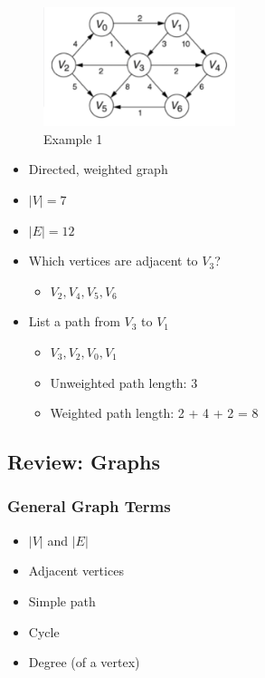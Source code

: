 \documentclass[
  10pt,
  english,
  letterpaper,
,tablecaptionabove
]{scrartcl}
\providecommand{\tightlist}{%
  \setlength{\itemsep}{0pt}\setlength{\parskip}{0pt}}
\begin{document}
\begin{figure}
\centering
\includegraphics[width=0.5\textwidth,height=\textheight]{images/2.png}
\caption{Example 1}
\end{figure}

\begin{itemize}
\tightlist
\item
  Directed, weighted graph
\item
  \(|V| = 7\)
\item
  \(|E| = 12\)
\item
  Which vertices are adjacent to \(V_3\)?

  \begin{itemize}
  \tightlist
  \item
    \(V_2, V_4, V_5, V_6\)
  \end{itemize}
\item
  List a path from \(V_3\) to \(V_1\)

  \begin{itemize}
  \tightlist
  \item
    \(V_3, V_2, V_0, V_1\)
  \item
    Unweighted path length: 3
  \item
    Weighted path length: 2 + 4 + 2 = 8
  \end{itemize}
\end{itemize}

\hypertarget{review-graphs}{%
\subsection{Review: Graphs}\label{review-graphs}}

\hypertarget{general-graph-terms}{%
\subsubsection{General Graph Terms}\label{general-graph-terms}}

\begin{itemize}
\tightlist
\item
  \(|V|\) and \(|E|\)
\item
  Adjacent vertices
\item
  Simple path
\item
  Cycle
\item
  Degree (of a vertex)
\end{itemize}
\end{document}
